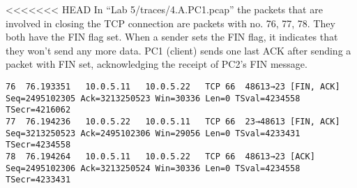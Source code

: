 <<<<<<< HEAD
In ``Lab 5/traces/4.A.PC1.pcap'' the packets that are involved in closing the TCP connection are packets with no. 76, 77, 78. They both have the FIN flag set. When a sender sets the FIN flag, it indicates that they won't send any more data. PC1 (client) sends one last ACK after sending a packet with FIN set, acknowledging the receipt of PC2's FIN message.

\begin{lstlisting}
76	76.193351	10.0.5.11	10.0.5.22	TCP	66	48613→23 [FIN, ACK] Seq=2495102305 Ack=3213250523 Win=30336 Len=0 TSval=4234558 TSecr=4216062
77	76.194236	10.0.5.22	10.0.5.11	TCP	66	23→48613 [FIN, ACK] Seq=3213250523 Ack=2495102306 Win=29056 Len=0 TSval=4233431 TSecr=4234558
78	76.194264	10.0.5.11	10.0.5.22	TCP	66	48613→23 [ACK] Seq=2495102306 Ack=3213250524 Win=30336 Len=0 TSval=4234558 TSecr=4233431
\end{lstlisting}
